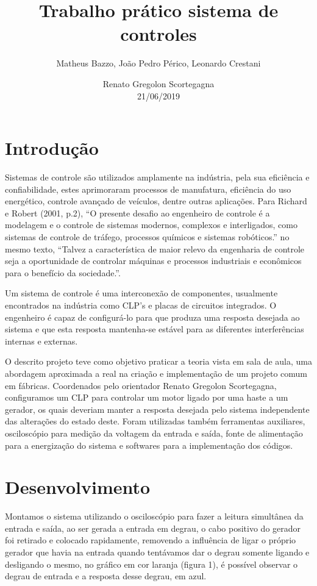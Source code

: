 \documentclass[12pt,a4paper]{article}
\title{Trabalho prático sistema de controles}
\author{Matheus Bazzo, João Pedro Périco, Leonardo Crestani}
\date{Renato Gregolon Scortegagna \\ \vspace{5mm} 21/06/2019} %
\begin{document}
\maketitle

\section{Introdução}

Sistemas de controle são utilizados amplamente na indústria, pela sua eficiência e confiabilidade, estes aprimoraram processos de manufatura, eficiência do uso energético, controle avançado de veículos, dentre outras aplicações. Para Richard e Robert (2001, p.2), “O presente desafio ao engenheiro de controle é a modelagem e o controle de sistemas modernos, complexos e interligados, como sistemas de controle de tráfego, processos químicos e sistemas robóticos.” no mesmo texto, “Talvez a característica de maior relevo da engenharia de controle seja a oportunidade de controlar máquinas e processos industriais e econômicos para o benefício da sociedade.”.

Um sistema de controle é uma interconexão de componentes, usualmente encontrados na indústria como CLP’s e placas de circuitos integrados. O engenheiro é capaz de configurá-lo para que produza uma resposta desejada ao sistema e que esta resposta mantenha-se estável para as diferentes interferências internas e externas.

O descrito projeto teve como objetivo praticar a teoria vista em sala de aula, uma abordagem aproximada a real na criação e implementação de um projeto comum em fábricas. Coordenados pelo orientador Renato Gregolon Scortegagna, configuramos um CLP para controlar um motor ligado por uma haste a um gerador, os quais deveriam manter a resposta desejada pelo sistema independente das alterações do estado deste. Foram utilizadas também ferramentas auxiliares, osciloscópio para medição da voltagem da entrada e saída, fonte de alimentação para a energização do sistema e softwares para a implementação dos códigos.

\section{Desenvolvimento}
    
Montamos o sistema utilizando o osciloscópio para fazer a leitura simultânea da entrada e saída, ao ser gerada a entrada em degrau, o cabo positivo do gerador foi retirado e colocado rapidamente, removendo a influência de ligar o próprio gerador que havia na entrada quando tentávamos dar o degrau somente ligando e desligando o mesmo, no gráfico em cor laranja (figura 1), é possível observar o degrau de entrada e a resposta desse degrau, em azul.
\end{document}
